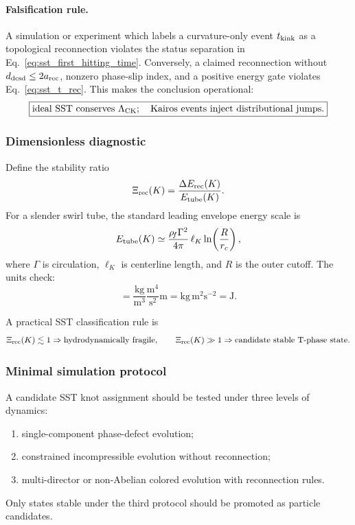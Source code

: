 \paragraph{Falsification rule.}
A simulation or experiment which labels a curvature-only event $t_{\rm kink}$ as a topological reconnection violates the status separation in Eq.~\eqref{eq:sst_first_hitting_time}. Conversely, a claimed reconnection without $d_{\rm dcsd}\le2a_{\rm rec}$, nonzero phase-slip index, and a positive energy gate violates Eq.~\eqref{eq:sst_t_rec}. This makes the conclusion operational:
\begin{equation}
    \boxed{
    \text{ideal SST conserves }\Lambda_{\rm CK};
    \quad
    \text{Kairos events inject distributional jumps.}
    }
    \label{eq:sst_ck_kairos_conclusion}
\end{equation}

\subsubsection{Dimensionless diagnostic}
Define the stability ratio
\begin{equation}
    \Xi_{\rm rec}(K)
    = \frac{\Delta E_{\rm rec}(K)}{E_{\rm tube}(K)}.
    \label{eq:xi_reconnection}
\end{equation}
For a slender swirl tube, the standard leading envelope energy scale is
\begin{equation}
    E_{\rm tube}(K)
    \simeq
    \frac{\rho_{\!f}\Gamma^2}{4\pi}\,\ell_K\ln\!\left(\frac{R}{r_c}\right),
    \label{eq:slender_tube_energy_scale}
\end{equation}
where $\Gamma$ is circulation, $\ell_K$ is centerline length, and $R$ is the outer cutoff. The units check:
\begin{equation}
    [\rhoF\Gamma^2\ell_K]
    = \frac{\mathrm{kg}}{\mathrm m^3}\frac{\mathrm m^4}{\mathrm s^2}\mathrm m
    = \mathrm{kg}\,\mathrm m^2\mathrm s^{-2}=\mathrm J.
\end{equation}

A practical SST classification rule is
\begin{equation}
    \Xi_{\rm rec}(K)\lesssim 1 \Rightarrow \text{hydrodynamically fragile},
    \qquad
    \Xi_{\rm rec}(K)\gg 1 \Rightarrow \text{candidate stable T-phase state}.
\end{equation}

\subsubsection{Minimal simulation protocol}
A candidate SST knot assignment should be tested under three levels of dynamics:
\begin{enumerate}
    \item single-component phase-defect evolution;
    \item constrained incompressible evolution without reconnection;
    \item multi-director or non-Abelian colored evolution with reconnection rules.
\end{enumerate}
Only states stable under the third protocol should be promoted as particle candidates.

